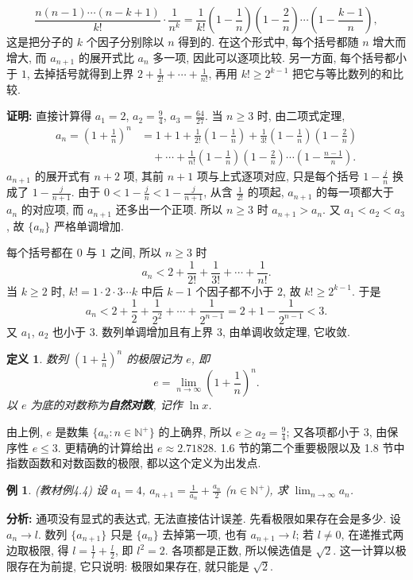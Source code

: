 \documentclass[UTF8,openany]{ctexbook}
\theoremstyle{chinesetextbook}
\newtheorem{definition}{定义}[section]
\newtheorem{example}{例}[section]
\newenvironment{cnproof}{\par\indent\textbf{证明:} \ignorespaces}{\par}
\begin{document}
\[
\frac{n(n-1)\cdots(n-k+1)}{k!}\cdot\frac1{n^k}=\frac1{k!}\left(1-\frac1n\right)\left(1-\frac2n\right)\cdots\left(1-\frac{k-1}n\right),
\]
这是把分子的 $k$ 个因子分别除以 $n$ 得到的. 在这个形式中, 每个括号都随 $n$ 增大而增大, 而 $a_{n+1}$ 的展开式比 $a_n$ 多一项, 因此可以逐项比较. 另一方面, 每个括号都小于 $1$, 去掉括号就得到上界 $\displaystyle2+\frac1{2!}+\cdots+\frac1{n!}$, 再用 $k!\ge2^{k-1}$ 把它与等比数列的和比较.
\begin{cnproof}
直接计算得 $a_1=2$, $\displaystyle a_2=\frac94$, $\displaystyle a_3=\frac{64}{27}$. 当 $n\ge3$ 时, 由二项式定理,
\[
\begin{aligned}
a_n=\left(1+\frac1n\right)^n
&=1+1+\frac1{2!}\left(1-\frac1n\right)+\frac1{3!}\left(1-\frac1n\right)\left(1-\frac2n\right)\\
&\quad+\cdots+\frac1{n!}\left(1-\frac1n\right)\left(1-\frac2n\right)\cdots\left(1-\frac{n-1}n\right).
\end{aligned}
\]
$a_{n+1}$ 的展开式有 $n+2$ 项, 其前 $n+1$ 项与上式逐项对应, 只是每个括号 $\displaystyle1-\frac jn$ 换成了 $\displaystyle1-\frac j{n+1}$. 由于 $\displaystyle0<1-\frac jn<1-\frac j{n+1}$, 从含 $\displaystyle\frac1{2!}$ 的项起, $a_{n+1}$ 的每一项都大于 $a_n$ 的对应项, 而 $a_{n+1}$ 还多出一个正项. 所以 $n\ge3$ 时 $a_{n+1}>a_n$. 又 $\displaystyle a_1<a_2<a_3$, 故 $\{a_n\}$ 严格单调增加.

每个括号都在 $0$ 与 $1$ 之间, 所以 $n\ge3$ 时
\[
a_n<2+\frac1{2!}+\frac1{3!}+\cdots+\frac1{n!}.
\]
当 $k\ge2$ 时, $k!=1\cdot2\cdot3\cdots k$ 中后 $k-1$ 个因子都不小于 $2$, 故 $k!\ge2^{k-1}$. 于是
\[
a_n<2+\frac12+\frac1{2^2}+\cdots+\frac1{2^{n-1}}=2+1-\frac1{2^{n-1}}<3.
\]
又 $a_1$, $a_2$ 也小于 $3$. 数列单调增加且有上界 $3$, 由单调收敛定理, 它收敛.
\end{cnproof}
\begin{definition}
数列 $\displaystyle\left(1+\frac1n\right)^n$ 的极限记为 $e$, 即
\[
e=\lim_{n\to\infty}\left(1+\frac1n\right)^n.
\]
以 $e$ 为底的对数称为\textbf{自然对数}, 记作 $\ln x$.
\end{definition}
由上例, $e$ 是数集 $\{a_n:n\in\mathbb N^+\}$ 的上确界, 所以 $\displaystyle e\ge a_2=\frac94$; 又各项都小于 $3$, 由保序性 $e\le3$. 更精确的计算给出 $e\approx2.71828$. 1.6 节的第二个重要极限以及 1.8 节中指数函数和对数函数的极限, 都以这个定义为出发点.
\begin{example}
\textnormal{(教材例4.4)} 设 $a_1=4$, $\displaystyle a_{n+1}=\frac1{a_n}+\frac{a_n}2$ ($n\in\mathbb N^+$), 求 $\displaystyle\lim_{n\to\infty}a_n$.
\end{example}
\par\indent\textbf{分析:} 通项没有显式的表达式, 无法直接估计误差. 先看极限如果存在会是多少. 设 $a_n\to l$. 数列 $\{a_{n+1}\}$ 只是 $\{a_n\}$ 去掉第一项, 也有 $a_{n+1}\to l$; 若 $l\ne0$, 在递推式两边取极限, 得 $\displaystyle l=\frac1l+\frac l2$, 即 $l^2=2$. 各项都是正数, 所以候选值是 $\sqrt2$. 这一计算以极限存在为前提, 它只说明: 极限如果存在, 就只能是 $\sqrt2$.
\end{document}
